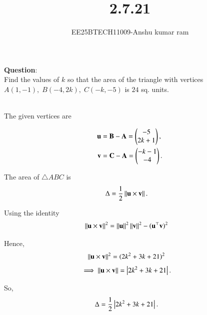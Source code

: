 \documentclass[journal]{IEEEtran}
\begin{document}

\vspace{3cm}

\title{2.7.21}
\author{EE25BTECH11009-Anshu kumar ram}
 \maketitle
{\let\newpage\relax\maketitle}

\renewcommand{\thefigure}{\theenumi}
\renewcommand{\thetable}{\theenumi}
\setlength{\intextsep}{10pt} %


\renewcommand{\thetable}{\theenumi}

\textbf{Question}:\\
Find the values of $k$ so that the area of the triangle with vertices 
$A(1,-1),\; B(-4,2k),\; C(-k,-5)$ is $24$ sq. units.

\solution \\

The given vertices are

\begin{align}
    \mathbf{u} &= \mathbf{B}-\mathbf{A} = \begin{pmatrix}-5 \\ 2k+1\end{pmatrix}, \\
    \mathbf{v} &= \mathbf{C}-\mathbf{A} = \begin{pmatrix}-k-1 \\ -4\end{pmatrix}.
\end{align}

The area of $\triangle ABC$ is
\begin{align}
    \Delta &= \frac{1}{2}\left\lVert\mathbf{u}\times \mathbf{v}\right\rVert.
\end{align}

Using the identity
\begin{align}
    \left\lVert\mathbf{u}\times\mathbf{v}\right\rVert^2 
    &= \left\lVert\mathbf{u}\right\rVert^2\left\lVert\mathbf{v}\right\rVert^2 - (\mathbf{u}^\top\mathbf{v})^2
\end{align}

Hence,
\begin{align}
    \left\lVert\mathbf{u}\times\mathbf{v}\right\rVert^2 
    &= (2k^2+3k+21)^2
\end{align}
\begin{align}
    \implies \left\lVert\mathbf{u}\times\mathbf{v}\right\rVert &= \left\vert2k^2+3k+21\right\vert.
\end{align}

So,
\begin{align}
    \Delta &= \frac{1}{2}\left\vert2k^2+3k+21\right\vert.
\end{align}
\end{document}
